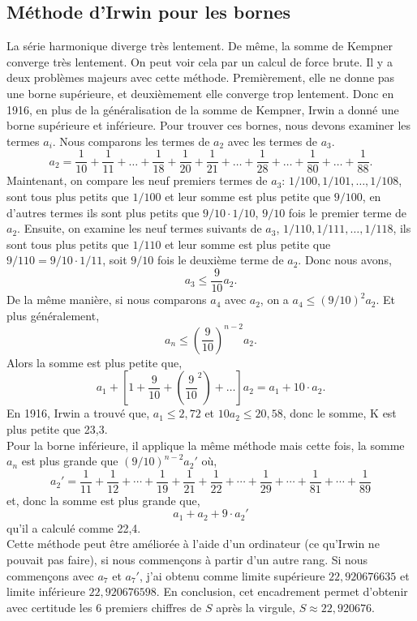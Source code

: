 \subsection{M\'ethode d'Irwin pour les bornes}
La s\'erie harmonique diverge tr\`es lentement. De m\^{e}me, la somme de Kempner
converge tr\`es lentement. On peut voir cela par un calcul de force brute. Il y
a deux probl\`emes majeurs avec cette m\'ethode. Premi\`erement, elle ne donne
pas une borne sup\'erieure, et deuxi\`emement elle converge trop lentement. Donc
en 1916, en plus de la g\'en\'eralisation de la somme de Kempner, Irwin
\cite{irwin} a donn\'e une borne sup\'erieure et inf\'erieure. Pour
trouver ces bornes, nous devons examiner les termes $a_{i}$. Nous comparons les
termes de $a_{2}$ avec les termes de $a_{3}$.
\begin{equation*}
	a_{2} = \frac{1}{10} + \frac{1}{11} + \dots + \frac{1}{18} + \frac{1}{20} +
	\frac{1}{21} + \dots + \frac{1}{28} + \dots + \frac{1}{80} + \dots +
	\frac{1}{88}.
\end{equation*}
Maintenant, on compare les neuf premiers termes de $a_{3}$: $1/100, 1/101,
\dots, 1/108$, sont tous plus petits que $1/100$ et leur somme est plus petite
que $9/100$, en d'autres termes ils sont plus petits que $9/10 \cdot 1/10$,
$9/10$ fois le premier terme de $a_{2}$. Ensuite, on examine les neuf termes
suivants de $a_{3}$, $1/110, 1/111, \dots, 1/118$, ils sont tous plus petits que
$1/110$ et leur somme est plus petite que $9/110 = 9/10\cdot 1/11$, soit $9/10$
fois le deuxi\`eme terme de $a_{2}$. Donc nous avons,
\[
	a_{3} \le \frac{9}{10}a_{2}.
\]
De la m\^eme mani\`ere, si nous comparons $a_{4}$ avec $a_{2}$, on a $a_{4} \le
(9/10)^{2} a_{2}$. Et plus g\'en\'eralement,
\[
	a_{n} \le \left( \frac{9}{10} \right)^{n-2} a_{2}.
\]
Alors la somme est plus petite que,
\begin{equation*}
	a_{1} + \left[ 1+\frac{9}{10} +\left(\frac{9}{10}^{2}\right) + \dots\right]
	a_{2} = a_{1} + 10\cdot a_{2}.
\end{equation*}
En 1916, Irwin a trouv\'e que, $a_{1} \le 2,72$ et $10a_{2} \le 20,58$, donc le
somme, K est plus petite que 23,3.\\
Pour la borne inf\'erieure, il applique la m\^eme m\'ethode mais cette fois, la
somme $a_{n}$ est plus grande que $(9/10)^{n-2}a_{2}{'}$ o\`u,
\begin{equation*}
	a_{2}{'} = \frac{1}{11} + \frac{1}{12} + \cdots + \frac{1}{19} + \frac{1}{21} +
	\frac{1}{22} + \cdots + \frac{1}{29} + \cdots + \frac{1}{81} + \cdots +
	\frac{1}{89}
\end{equation*}
et, donc la somme est plus grande que,
\[
	a_{1} + a_{2} + 9\cdot a_{2}{'}
\]
qu'il a calcul\'e comme 22,4.\\
Cette m\'ethode peut \^etre am\'elior\'ee \`a l'aide d'un ordinateur (ce
qu'Irwin ne pouvait pas faire), si nous commençons \`a partir d'un autre rang.
Si nous commençons avec $a_{7}$ et $a_{7}{'}$, j'ai obtenu comme limite sup\'erieure
$22,920676635$ et limite inf\'erieure $22,920676598$. En conclusion, cet
encadrement permet d'obtenir avec certitude les 6 premiers chiffres de $S$
apr\`es la virgule, $S \approx 22,920676$.
